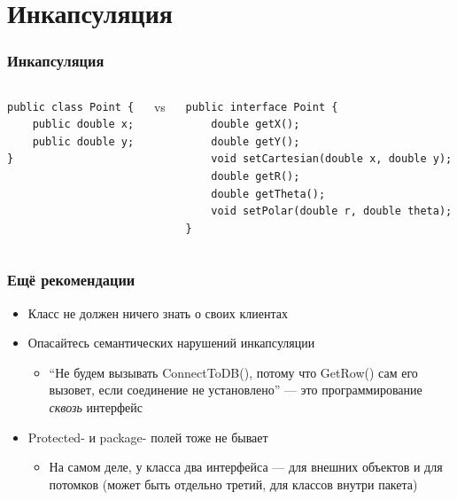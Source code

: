 \documentclass[xetex,mathserif,serif]{beamer}
\begin{document}
    \section{Инкапсуляция}

    \begin{frame}[fragile]
        \frametitle{Инкапсуляция}
        \begin{columns}
            \begin{column}{0.32\textwidth}
                \begin{verbatim}
public class Point {
    public double x;
    public double y;
}
                \end{verbatim}
            \end{column}
            \begin{column}{0.05\textwidth}
                vs
            \end{column}
            \begin{column}{0.6\textwidth}
                \begin{verbatim}
public interface Point {
    double getX();
    double getY();
    void setCartesian(double x, double y);
    double getR();
    double getTheta();
    void setPolar(double r, double theta);
}
                \end{verbatim}
            \end{column}
        \end{columns}
    \end{frame}

    \begin{frame}
        \frametitle{Ещё рекомендации}
        \begin{itemize}
            \item Класс не должен ничего знать о своих клиентах
            \item Опасайтесь семантических нарушений инкапсуляции
            \begin{itemize}
                \item ``Не будем вызывать ConnectToDB(), потому что GetRow() сам его вызовет, если соединение не установлено'' --- это программирование \textit{сквозь} интерфейс
            \end{itemize}
            \item Protected- и package- полей тоже не бывает
            \begin{itemize}
                \item На самом деле, у класса два интерфейса --- для внешних объектов и для потомков (может быть отдельно третий, для классов внутри пакета)
            \end{itemize}
        \end{itemize}
    \end{frame}
\end{document}
